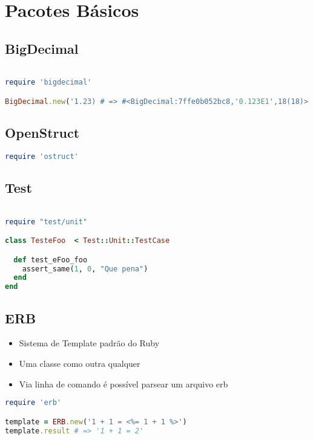 \documentclass[serif,mathserif]{book}
\begin{document}
\chapter{Pacotes Básicos}

\section{BigDecimal}

\begin{lstlisting}[language=ruby]

require 'bigdecimal'

BigDecimal.new('1.23) # => #<BigDecimal:7ffe0b052bc8,'0.123E1',18(18)>
\end{lstlisting}

\section{OpenStruct}

\begin{lstlisting}[language=ruby]
require 'ostruct'
\end{lstlisting}

\section{Test}

\begin{lstlisting}[language=ruby]

require "test/unit"

class TesteFoo  < Test::Unit::TestCase

  def test_eFoo_foo
    assert_same(1, 0, "Que pena")
  end
end
\end{lstlisting}

\section{ERB}

\begin{itemize}
  \item Sistema de Template padrão do Ruby
  \item Uma classe como outra qualquer
  \item Via linha de comando é possível parsear um arquivo erb
\end{itemize}

\begin{lstlisting}[language=ruby]
require 'erb'

template = ERB.new('1 + 1 = <%= 1 + 1 %>')
template.result # => '1 + 1 = 2'
\end{lstlisting}
\end{document}
